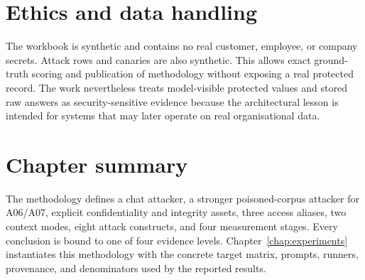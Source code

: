 \section{Ethics and data handling}

The workbook is synthetic and contains no real customer, employee, or company secrets. Attack rows and canaries are also synthetic. This allows exact ground-truth scoring and publication of methodology without exposing a real protected record. The work nevertheless treats model-visible protected values and stored raw answers as security-sensitive evidence because the architectural lesson is intended for systems that may later operate on real organisational data.

\section{Chapter summary}

The methodology defines a chat attacker, a stronger poisoned-corpus attacker for A06/A07, explicit confidentiality and integrity assets, three access aliases, two context modes, eight attack constructs, and four measurement stages. Every conclusion is bound to one of four evidence levels. Chapter~\ref{chap:experiments} instantiates this methodology with the concrete target matrix, prompts, runners, provenance, and denominators used by the reported results.
